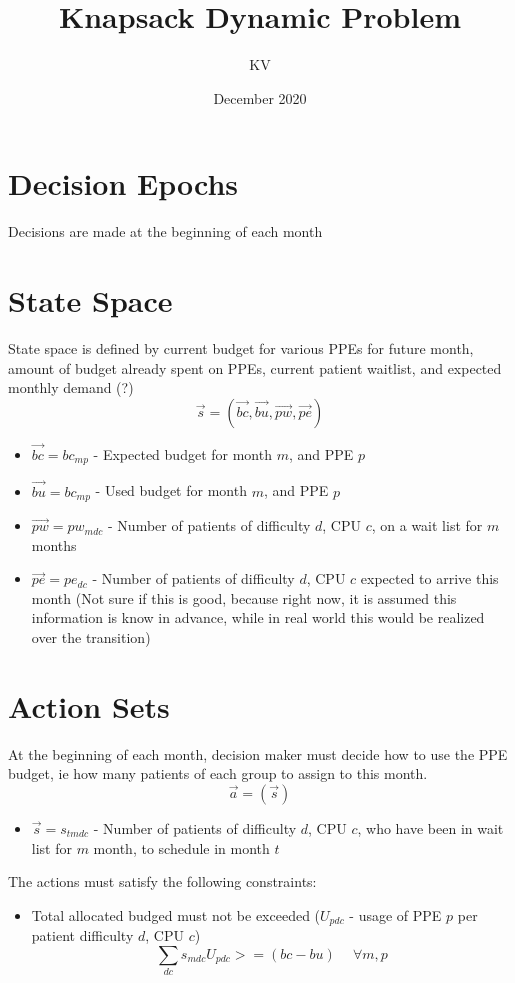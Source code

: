 \documentclass{article}
\title{Knapsack Dynamic Problem}
\author{KV}
\date{December 2020}
\begin{document}
\maketitle

\section{Decision Epochs}
Decisions are made at the beginning of each month

\section{State Space}
State space is defined by current budget for various PPEs for future month, amount of budget already spent on PPEs, current patient waitlist, and expected monthly demand (?)
\[ \vec{s}  = (\vec{bc}, \vec{bu}, \vec{pw}, \vec{pe})\]
\begin{itemize}
    \item $\vec{bc} = bc_{mp}$ - Expected budget for month $m$, and PPE $p$
    \item $\vec{bu} = bc_{mp}$ - Used budget for month $m$, and PPE $p$
    \item $\vec{pw} = pw_{mdc}$ - Number of patients of difficulty $d$, CPU $c$, on a wait list for $m$ months
    \item $\vec{pe} = pe_{dc}$ - Number of patients of difficulty $d$, CPU $c$ expected to arrive this month (Not sure if this is good, because right now, it is assumed this information is know in advance, while in real world this would be realized over the transition)
\end{itemize}

\section{Action Sets}
At the beginning of each month, decision maker must decide how to use the PPE budget, ie how many patients of each group to assign to this month.
\[ \vec{a} = (\vec{s}) \]
\begin{itemize}
    \item $\vec{s} = s_{tmdc}$ - Number of patients of difficulty $d$, CPU $c$, who have been in wait list for $m$ month, to schedule in month $t$
\end{itemize}
The actions must satisfy the following constraints:
\begin{itemize}
    \item Total allocated budged must not be exceeded ($U_{pdc}$ - usage of PPE $p$ per patient difficulty $d$, CPU $c$)
        \[ \sum_{dc}s_{mdc}U_{pdc} >= (bc - bu)\ \quad \forall m, p \]
\end{itemize}
\end{document}

